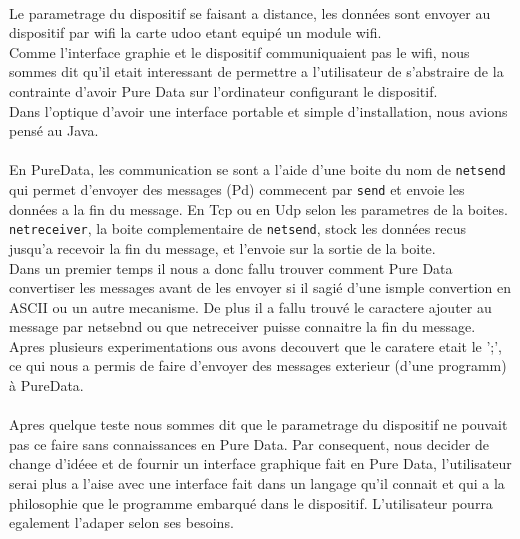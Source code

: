 \documentclass[a4paper, titlepage, oneside, 12pt]{article}%
\begin{document}
\paragraph{}
Le parametrage du dispositif se faisant a distance, les données sont envoyer au dispositif par wifi la carte udoo etant equipé un module wifi.\\
Comme l'interface graphie et le dispositif communiquaient pas le wifi, nous sommes dit qu'il etait interessant de permettre a l'utilisateur de s'abstraire de la contrainte d'avoir Pure Data sur l'ordinateur configurant le dispositif. \\
Dans l'optique d'avoir une interface portable et simple d'installation, nous avions pensé au Java.
\paragraph{}
En PureData, les communication se sont a l'aide d'une boite du nom de \texttt{netsend} qui permet d'envoyer des messages (Pd) commecent par \texttt{send} et envoie les données a la fin du message. En Tcp ou en Udp selon les parametres de la boites.\\
\texttt{netreceiver}, la boite complementaire de \texttt{netsend}, stock les données recus jusqu'a recevoir la fin du message, et l'envoie sur la sortie de la boite.\\
Dans un premier temps il nous a donc fallu trouver comment Pure Data convertiser les messages avant de les envoyer si il sagié d'une ismple convertion en ASCII ou un autre  mecanisme. De plus il a fallu trouvé le caractere ajouter au message par netsebnd ou que netreceiver puisse connaitre la fin du message.\\
Apres plusieurs experimentations ous avons decouvert que le caratere etait le ';', ce qui nous a permis de faire d'envoyer des messages exterieur (d'une programm) à PureData.

\paragraph{}
Apres quelque teste nous sommes dit que le parametrage du dispositif ne pouvait pas ce faire sans connaissances en Pure Data. Par consequent, nous decider de change d'idéee et de fournir un interface graphique fait en Pure Data, l'utilisateur serai plus a l'aise avec une interface fait dans un langage qu'il connait et qui a la philosophie que le programme embarqué dans le dispositif. L'utilisateur pourra egalement l'adaper selon ses besoins.
\end{document}
